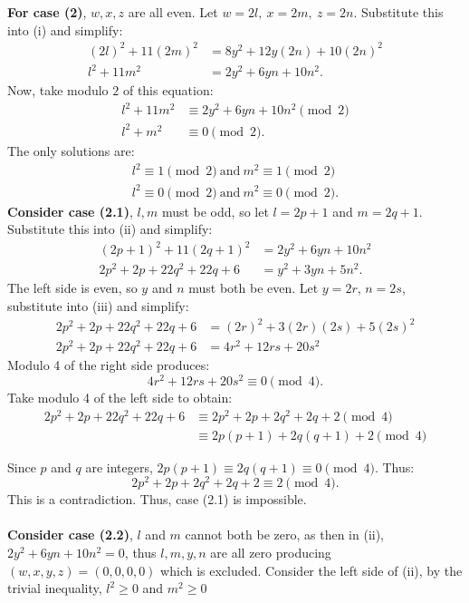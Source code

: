 \documentclass{article}
\begin{document}
\textbf{For case (2)}, $w,x,z$ are all even. Let $w = 2l,\ x = 2m,\ z = 2n$. Substitute this into (i) and simplify:
\begin{align*}
    (2l)^2 + 11(2m)^2 &= 8y^2 + 12y(2n) + 10(2n)^2 \\
    l^2 + 11m^2 &= 2y^2 + 6yn + 10n^2. \tag{ii}
\end{align*}
Now, take modulo $2$ of this equation:
\begin{align*}
    l^2 + 11m^2 &\equiv 2y^2 + 6yn + 10n^2 \pmod 2 \\
    l^2 + m^2 &\equiv 0 \pmod 2.
\end{align*}
The only solutions are:
\begin{align*}
    l^2 \equiv 1 \pmod 2 \ \text{and}\ m^2 \equiv 1 \pmod 2 \tag{2.1} \\
    l^2 \equiv 0 \pmod 2 \ \text{and}\ m^2 \equiv 0 \pmod 2. \tag{2.2}
\end{align*}
\newpage
\textbf{Consider case (2.1)}, $l,m$ must be odd, so let $l = 2p + 1$ and $m = 2q + 1$. Substitute this into (ii) and simplify:
\begin{align*}
    (2p + 1)^2 + 11(2q + 1)^2 &= 2y^2 + 6yn + 10n^2 \\
    2p^2 + 2p + 22q^2 + 22q + 6 &= y^2 + 3yn + 5n^2. \tag{iii}
\end{align*}
The left side is even, so $y$ and $n$ must both be even. Let $y = 2r$, $n = 2s$, substitute into (iii) and simplify:
\begin{align*}
    2p^2 + 2p + 22q^2 + 22q + 6 &= (2r)^2 + 3(2r)(2s) + 5(2s)^2 \\
    2p^2 + 2p + 22q^2 + 22q + 6 &= 4r^2 + 12rs + 20s^2
\end{align*}
Modulo 4 of the right side produces:
$$4r^2 + 12rs + 20s^2 \equiv 0 \pmod 4.$$
Take modulo 4 of the left side to obtain:
\begin{align*}
    2p^2 + 2p + 22q^2 + 22q + 6 &\equiv 2p^2 + 2p + 2q^2 + 2q + 2 \pmod 4 \\
    &\equiv 2p(p + 1) + 2q(q+1) + 2 \pmod 4
\end{align*}

Since $p$ and $q$ are integers, $2p(p + 1) \equiv 2q(q+1) \equiv 0 \pmod 4$. Thus:
$$2p^2 + 2p + 2q^2 + 2q + 2 \equiv 2 \pmod 4.$$
This is a contradiction. Thus, case (2.1) is impossible. \\ \\

\textbf{Consider case (2.2)}, $l$ and $m$ cannot both be zero, as then in (ii), $2y^2 + 6yn + 10n^2 = 0$, thus $l,m,y,n$ are all zero producing $(w,x,y,z) = (0,0,0,0)$ which is excluded. Consider the left side of (ii), by the trivial inequality, $l^2 \ge 0$ and $m^2 \ge 0$ 
\end{document}
